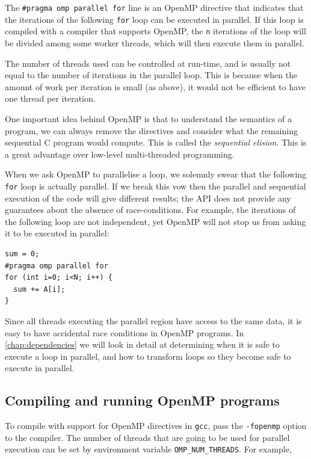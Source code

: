 The \lstinline{#pragma omp parallel for} line is an OpenMP directive
that indicates that the iterations of the following \texttt{for} loop
can be executed in parallel.  If this loop is compiled with a compiler
that supports OpenMP, the \texttt{n} iterations of the loop will be
divided among some worker threads, which will then execute them in
parallel.

The number of threads used can be controlled at run-time, and is
usually not equal to the number of iterations in the parallel loop.
This is because when the amount of work per iteration is small (as
above), it would not be efficient to have one thread per iteration.

One important idea behind OpenMP is that to understand the semantics
of a program, we can always remove the directives and consider what
the remaining sequential C program would compute.  This is called the
\emph{sequential elision}.  This is a great advantage over low-level
multi-threaded programming.

When we ask OpenMP to parallelise a loop, we solemnly swear that the
following \lstinline{for} loop is actually parallel.  If we break this
vow then the parallel and sequential execution of the code will give
different results; the API does not provide any guarantees about the
absence of race-conditions.  For example, the iterations of the
following loop are not independent, yet OpenMP will not stop us from
asking it to be executed in parallel:

\begin{lstlisting}[mathescape=true]
sum = 0;
#pragma omp parallel for
for (int i=0; i<N; i++) {
  sum += A[i];
}
\end{lstlisting}

Since all threads executing the parallel region have access to the
same data, it is easy to have accidental race conditions in OpenMP
programs.  In \cref{chap:dependencies} we will look in detail at
determining when it is safe to execute a loop in parallel, and how to
transform loops so they become safe to execute in parallel.

\subsection{Compiling and running OpenMP programs}

To compile with support for OpenMP directives in \texttt{gcc}, pass
the \texttt{-fopenmp} option to the compiler. The number of threads
that are going to be used for parallel execution can be set by
environment variable \texttt{OMP\_NUM\_THREADS}.  For example,


